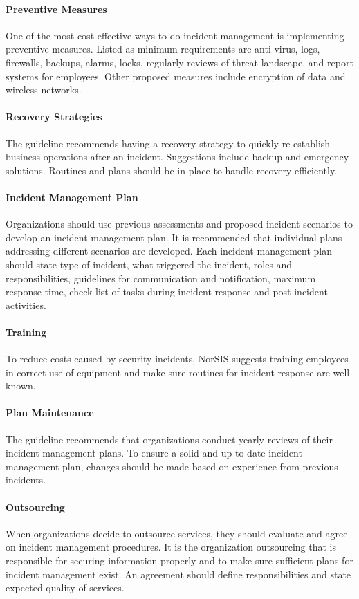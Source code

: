 \paragraph{Preventive Measures}
One of the most cost effective ways to do incident management is implementing preventive measures. Listed as minimum requirements are anti-virus, logs, firewalls, backups, alarms, locks, regularly reviews of threat landscape, and report systems for employees. Other proposed measures include encryption of data and wireless networks.   

\paragraph{Recovery Strategies}
The guideline recommends having a recovery strategy to quickly re-establish business operations after an incident. Suggestions include backup and emergency solutions. Routines and plans should be in place to handle recovery efficiently.

\paragraph{Incident Management Plan}
Organizations should use previous assessments and proposed incident scenarios to develop an incident management plan. It is recommended that individual plans addressing different scenarios are developed. Each incident management plan should state type of incident, what triggered the incident, roles and responsibilities, guidelines for communication and notification, maximum response time, check-list of tasks during incident response and post-incident activities.

\paragraph{Training}
To reduce costs caused by security incidents, NorSIS suggests training employees in correct use of equipment and make sure routines for incident response are well known.

\paragraph{Plan Maintenance}
The guideline recommends that organizations conduct yearly reviews of their incident management plans. To ensure a solid and up-to-date incident management plan, changes should be made based on experience from previous incidents. 

\paragraph{Outsourcing}
When organizations decide to outsource services, they should evaluate and agree on incident management procedures. It is the organization outsourcing that is responsible for securing information properly and to make sure sufficient plans for incident management exist. An agreement should define responsibilities and state expected quality of services. 


